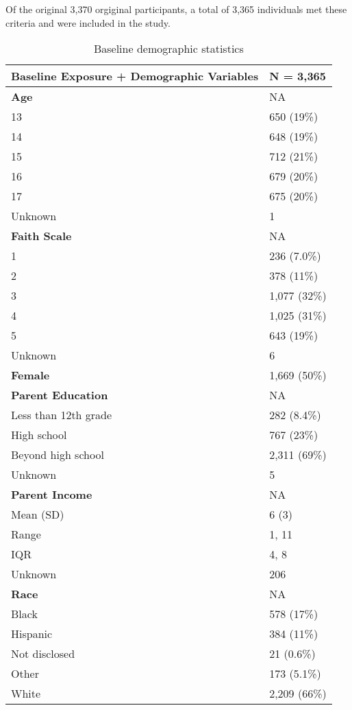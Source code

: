 \documentclass[
  single column]{article}
\begin{document}
Of the original 3,370 orgiginal participants, a total of 3,365
individuals met these criteria and were included in the study.

\newpage{}

\begin{longtable}[]{@{}ll@{}}

\caption{\label{tbl-table-demography}Baseline demographic statistics}

\tabularnewline

\toprule\noalign{}
\textbf{Baseline Exposure + Demographic Variables} & \textbf{N =
3,365} \\
\midrule\noalign{}
\endhead
\bottomrule\noalign{}
\endlastfoot
\textbf{Age} & NA \\
13 & 650 (19\%) \\
14 & 648 (19\%) \\
15 & 712 (21\%) \\
16 & 679 (20\%) \\
17 & 675 (20\%) \\
Unknown & 1 \\
\textbf{Faith Scale} & NA \\
1 & 236 (7.0\%) \\
2 & 378 (11\%) \\
3 & 1,077 (32\%) \\
4 & 1,025 (31\%) \\
5 & 643 (19\%) \\
Unknown & 6 \\
\textbf{Female} & 1,669 (50\%) \\
\textbf{Parent Education} & NA \\
Less than 12th grade & 282 (8.4\%) \\
High school & 767 (23\%) \\
Beyond high school & 2,311 (69\%) \\
Unknown & 5 \\
\textbf{Parent Income} & NA \\
Mean (SD) & 6 (3) \\
Range & 1, 11 \\
IQR & 4, 8 \\
Unknown & 206 \\
\textbf{Race} & NA \\
Black & 578 (17\%) \\
Hispanic & 384 (11\%) \\
Not disclosed & 21 (0.6\%) \\
Other & 173 (5.1\%) \\
White & 2,209 (66\%) \\

\end{longtable}
\end{document}
